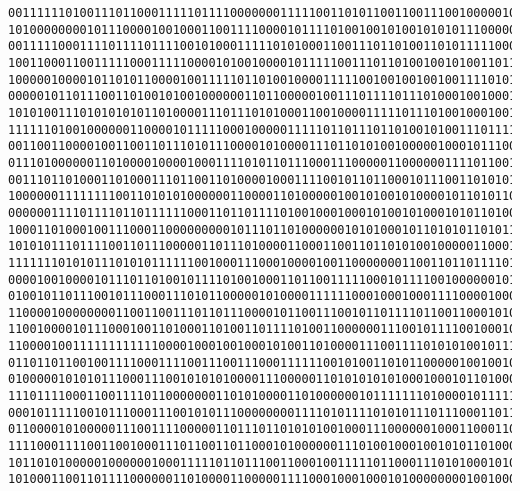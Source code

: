 \documentclass[oneside,10pt]{book}
\begin{document}
\begin{lstlisting}
0011111101001110110001111101111000000011111001101011001100111001000001011110010111111100\
1010000000010111000010010001100111100001011110100100101001010101110000001000110101111111\
0011111000111101111011110010100011111010100011001110110100110101111100011000001010010111\
1001100011001111100011111000010100100001011111001110110100100101001101100000101011110001\
1000001000010110101100001001111101101001000011111001001001001001111010110110111000111111\
0000010110111001101001010010000001101100000100111011110111010001001000100101001100000111\
1010100111010101010110100001110111010100011001000011111011101001000100111110100011010100\
1111110100100000011000010111110001000001111101101110110100101001110111110110101100011001\
0011001100001001100110111010111000010100001110110101001000001000101110000111101000100110\
0111010000001101000010000100011110101101110001110000011000000111101100100000001101110101\
0011101101000110100011101100110100001000111100101101100010111001101010110010111001011011\
1000000111111110011010101000000110000110100000100101001010000101101011001000000011000010\
0000001111011110110111111000110110111101001000100010100101000101011010011110010010010001\
1000110100010011100011000000000101110110100000010101000101101010110101100000100000111111\
1010101110111100110111000001101110100001100011001101101010010000011000111111110011111111\
1111111010101110101011111100100011100010000100110000000110011011011110101011100001001101\
0000100100001011101101001011110100100011011001111100010111100100000010110110111001001110\
0100101101110010111000111010110000010100001111110001000100011110000100010100000101001101\
1100001000000001100110011101101110000101100111001011011110110011000101011101110011100011\
1100100001011100010011010001101001101111010011000000111001011110010001000000010001101000\
1100001001111111111110000100010010001010011010000111001111010101001011110101001100110011\
0110110110010011110001111001110011100011111100101001101011000001001001010101100111000010\
0100000101010111000111001010101000011100000110101010101000100010110100010000110001100010\
1110111100011001111011000000011010100001101000000101111111010000101111100101001111011001\
0001011111001011100011100101011100000000111101011110101011101110001101110000010010110110\
0110000101000001110011110000011011101101010100100011100000010001100011010100111111100001\
1111000111100110010001110110011011000101000000111010010001001010110100010011100000010110\
1011010100000100000010001111101101110011000100111110110001110101000101001100100111010000\
1010001100110111100000011010000110000011110001000100010100000000100100001001101100101001\

\end{lstlisting}
\end{document}
